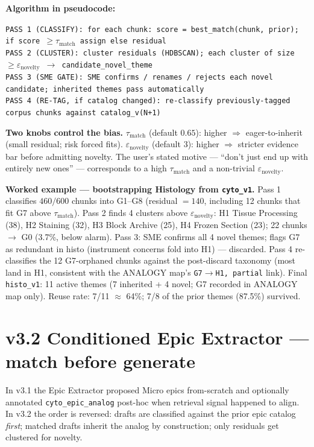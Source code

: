 \documentclass[10pt,letterpaper]{article}
\begin{document}
\textbf{Algorithm in pseudocode:}

\noindent\texttt{\scriptsize PASS 1 (CLASSIFY): for each chunk: score = best\_match(chunk, prior); if score $\geq\tau_{\text{match}}$ assign else residual\\
PASS 2 (CLUSTER): cluster residuals (HDBSCAN); each cluster of size $\geq\varepsilon_{\text{novelty}}$ $\rightarrow$ candidate\_novel\_theme\\
PASS 3 (SME GATE): SME confirms / renames / rejects each novel candidate; inherited themes pass automatically\\
PASS 4 (RE-TAG, if catalog changed): re-classify previously-tagged corpus chunks against catalog\_v(N+1)}

\textbf{Two knobs control the bias.} $\tau_{\text{match}}$ (default $0.65$): higher $\Rightarrow$ eager-to-inherit (small residual; risk forced fits). $\varepsilon_{\text{novelty}}$ (default $3$): higher $\Rightarrow$ stricter evidence bar before admitting novelty. The user's stated motive --- ``don't just end up with entirely new ones'' --- corresponds to a high $\tau_{\text{match}}$ and a non-trivial $\varepsilon_{\text{novelty}}$.

\textbf{Worked example --- bootstrapping Histology from \texttt{cyto\_v1}.} Pass 1 classifies $460/600$ chunks into G1--G8 (residual $= 140$, including 12 chunks that fit G7 above $\tau_{\text{match}}$). Pass 2 finds 4 clusters above $\varepsilon_{\text{novelty}}$: H1 Tissue Processing (38), H2 Staining (32), H3 Block Archive (25), H4 Frozen Section (23); 22 chunks $\rightarrow$ G0 (3.7\%, below alarm). Pass 3: SME confirms all 4 novel themes; flags G7 as redundant in histo (instrument concerns fold into H1) --- discarded. Pass 4 re-classifies the 12 G7-orphaned chunks against the post-discard taxonomy (most land in H1, consistent with the ANALOGY map's \texttt{G7$\rightarrow$H1, partial} link). Final \texttt{histo\_v1}: 11 active themes (7 inherited + 4 novel; G7 recorded in ANALOGY map only). Reuse rate: 7/11 $\approx$ 64\%; 7/8 of the prior themes (87.5\%) survived.

\section{v3.2 Conditioned Epic Extractor --- match before generate}

In v3.1 the Epic Extractor proposed Micro epics from-scratch and optionally annotated \texttt{cyto\_epic\_analog} post-hoc when retrieval signal happened to align. In v3.2 the order is reversed: drafts are classified against the prior epic catalog \emph{first}; matched drafts inherit the analog by construction; only residuals get clustered for novelty.
\end{document}
